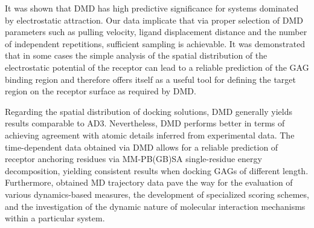 It was shown that DMD has high predictive significance for systems dominated by
electrostatic attraction. Our data implicate that via proper selection of DMD
parameters such as pulling velocity, ligand displacement distance and the number
of independent repetitions, sufficient sampling is achievable. It was
demonstrated that in some cases the simple analysis of the spatial distribution
of the electrostatic potential of the receptor can lead to a reliable prediction
of the GAG binding region and therefore offers itself as a useful tool for
defining the target region on the receptor surface as required by DMD.

Regarding the spatial distribution of docking solutions, DMD generally yields
results comparable to AD3. Nevertheless, DMD performs better in terms of
achieving agreement with atomic details inferred from experimental data. The
time-dependent data obtained via DMD allows for a reliable prediction of
receptor anchoring residues via MM-PB(GB)SA single-residue energy decomposition,
yielding consistent results when docking GAGs of different length. Furthermore,
obtained MD trajectory data pave the way for the evaluation of various
dynamics-based measures, the development of specialized scoring schemes, and the
investigation of the dynamic nature of molecular interaction mechanisms within a
particular system.

